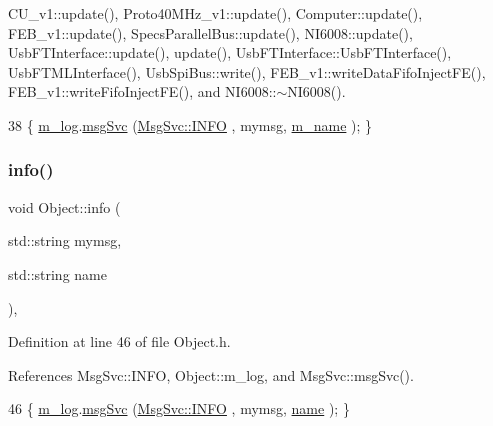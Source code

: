 C\+U\+\_\+v1\+::update(), Proto40\+M\+Hz\+\_\+v1\+::update(), Computer\+::update(), F\+E\+B\+\_\+v1\+::update(), Specs\+Parallel\+Bus\+::update(), N\+I6008\+::update(), Usb\+F\+T\+Interface\+::update(), update(), Usb\+F\+T\+Interface\+::\+Usb\+F\+T\+Interface(), Usb\+F\+T\+M\+L\+Interface(), Usb\+Spi\+Bus\+::write(), F\+E\+B\+\_\+v1\+::write\+Data\+Fifo\+Inject\+F\+E(), F\+E\+B\+\_\+v1\+::write\+Fifo\+Inject\+F\+E(), and N\+I6008\+::$\sim$\+N\+I6008().


\begin{DoxyCode}
38 \{ \hyperlink{classObject_a0d269813dd7ac1f24bc143031e2963f2}{m\_log}.\hyperlink{classMsgSvc_ad25f18047920cc59a314e5098259711c}{msgSvc} (\hyperlink{classMsgSvc_ae671eb7301996cd049d2da8a65925926ad2fcf3f3e734fc41ee097cc23670ce51}{MsgSvc::INFO}    , mymsg, \hyperlink{classObject_a8b83c95c705d2c3ba0d081fe1710f48d}{m\_name} ); \}
\end{DoxyCode}
\mbox{\label{classObject_a1ca123253dfd30fc28b156f521dcbdae}} 
\subsubsection{\texorpdfstring{info()}{info()}\hspace{0.1cm}{\footnotesize\ttfamily [2/2]}}
{\footnotesize\ttfamily void Object\+::info (\begin{DoxyParamCaption}\item[{std\+::string}]{mymsg,  }\item[{std\+::string}]{name }\end{DoxyParamCaption})\hspace{0.3cm}{\ttfamily [inline]}, {\ttfamily [inherited]}}



Definition at line 46 of file Object.\+h.



References Msg\+Svc\+::\+I\+N\+FO, Object\+::m\+\_\+log, and Msg\+Svc\+::msg\+Svc().


\begin{DoxyCode}
46 \{ \hyperlink{classObject_a0d269813dd7ac1f24bc143031e2963f2}{m\_log}.\hyperlink{classMsgSvc_ad25f18047920cc59a314e5098259711c}{msgSvc} (\hyperlink{classMsgSvc_ae671eb7301996cd049d2da8a65925926ad2fcf3f3e734fc41ee097cc23670ce51}{MsgSvc::INFO}    , mymsg, \hyperlink{classObject_a300f4c05dd468c7bb8b3c968868443c1}{name} ); \}
\end{DoxyCode}
\mbox{\label{classUsbFTMLInterface_a7f7c96ece97e607b88425823a2923a43}} 
